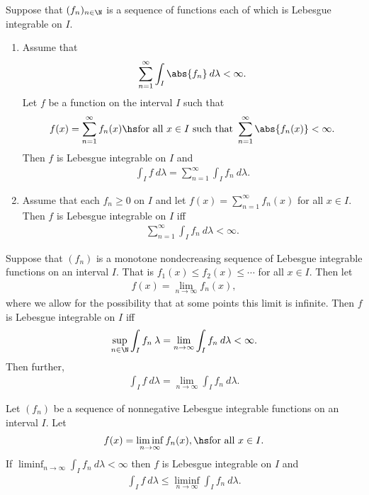 \documentclass{article}
\begin{document}
\begin{theorem}[Notes 4.3]
	Suppose that $(f_n)_{n\in\N}$ is a sequence of functions each of which is Lebesgue integrable on $I$.
	\begin{enumerate}
		\item Assume that \begin{align*}
			      \sum_{n=1}^\infty \int_I \abs{f_n}\:d\lambda < \infty.
		      \end{align*}
		      Let $f$ be a function on the interval $I$ such that \begin{align*}
			      f(x) = \sum_{n=1}^\infty f_n(x)\hs\text{for all $x\in I$ such that }\sum_{n=1}^\infty \abs{f_n(x)}<\infty.
		      \end{align*}
		      Then $f$ is Lebesgue integrable on $I$ and \begin{align*}
			      \int_I f\:d\lambda= \sum_{n=1}^\infty \int_I f_n\:d\lambda.
		      \end{align*}
		\item Assume that each $f_n\geq 0$ on $I$ and let $f(x)=\sum_{n=1}^\infty f_n(x)$ for all $x\in I$. Then $f$
		      is Lebesgue integrable on $I$ iff \begin{align*}
			      \sum_{n=1}^\infty \int_I f_n\:d\lambda< \infty.
		      \end{align*}
	\end{enumerate}
\end{theorem}

\begin{theorem}
	Suppose that $(f_n)$ is a monotone nondecreasing sequence of Lebesgue integrable functions on an interval $I$. That is
	$f_1(x) \leq f_2(x) \leq \cdots$ for all $x\in I$. Then let
	\begin{align*}
		f(x) = \lim_{n\to\infty}f_n(x),
	\end{align*}
	where we allow for the possibility that at some points this limit is infinite. Then $f$ is Lebesgue integrable on $I$
	iff
	\begin{align*}
		\sup_{n\in\N}\int_I f_n\:\lambda = \lim_{n\to\infty}\int_I f_n\:d\lambda< \infty.
	\end{align*}
	Then further,
	\begin{align*}
		\int_I f\:d\lambda= \lim_{n\to\infty} \int_I f_n\:d\lambda.
	\end{align*}
\end{theorem}

\begin{lemma}[Fatoux]
	Let $(f_n)$ be a sequence of nonnegative Lebesgue integrable functions on an interval $I$. Let
	\begin{align*}
		f(x) = \liminf_{n\to\infty} f_n(x), \hs\text{for all $x\in I$}.
	\end{align*}
	If $\liminf_{n\to\infty}\int_I f_n\:d\lambda<\infty$ then $f$ is Lebesgue integrable on $I$ and
	\begin{align*}
		\int_I f\:d\lambda\leq \liminf_{n\to\infty} \int_I f_n\:d\lambda.
	\end{align*}
\end{lemma}
\end{document}
